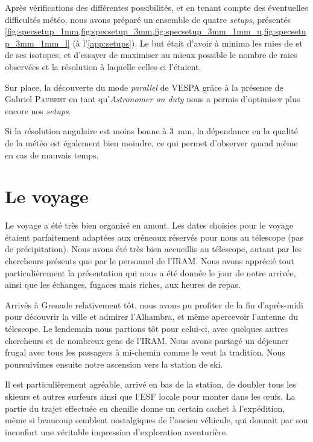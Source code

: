 \documentclass[a4paper,10pt,french]{article}
\newcommand{\troismm}{\SI{3}{\milli\meter}}
\begin{document}
Après vérifications des différentes possibilités, et en tenant compte des éventuelles
difficultés météo, nous avons préparé un ensemble de quatre \textit{setups},
présentés
\cref{fig:specsetup_1mm,fig:specsetup_3mm,fig:specsetup_3mm_1mm_u,fig:specsetup_3mm_1mm_l}
(à l’\cref{app:setups}). Le but était d’avoir à minima les raies de  et
de ses isotopes, et d’essayer de maximiser au mieux possible le nombre de raies
observées et la résolution à laquelle celles-ci l’étaient.

Sur place, la découverte du mode \textit{parallel} de VESPA grâce à la présence
de Gabriel \textsc{Paubert} en tant qu’\textit{Astronomer on duty} nous a
permis d’optimiser plus encore nos \textit{setups}.

Si la résolution angulaire est moins bonne à \troismm, la dépendance en la
qualité de la météo est également bien moindre, ce qui permet d’observer quand
même en cas de mauvais temps.

\section{Le voyage}

Le voyage a été très bien organisé en amont. Les dates choisies pour le voyage
étaient parfaitement adaptées aux créneaux réservés pour nous au télescope (pas
de précipitation). Nous avons été très bien accueillis au télescope, autant par
les chercheurs présents que par le personnel de l’IRAM. Nous avons apprécié
tout particulièrement la présentation qui nous a été donnée le jour de notre
arrivée, ainsi que les échanges, fugaces mais riches, aux heures de repas.

Arrivés à Grenade relativement tôt, nous avons pu profiter de la fin
d’après-midi pour découvrir la ville et admirer l’Alhambra, et même apercevoir
l’antenne du télescope. Le lendemain nous partions tôt pour celui-ci, avec
quelques autres chercheurs et de nombreux gens de l’IRAM. Nous avons partagé un
déjeuner frugal avec tous les passagers à mi-chemin comme le veut la tradition.
Nous poursuivîmes ensuite notre ascension vers la station de ski.

Il est particulièrement agréable, arrivé en bas de la station, de doubler tous
les skieurs et autres surfeurs ainsi que l’ESF locale pour monter dans les
œufs. La partie du trajet effectuée en chenille donne un certain cachet à
l’expédition, même si beaucoup semblent nostalgiques de l’ancien véhicule, qui
donnait par son inconfort une véritable impression d’exploration aventurière.
\end{document}
